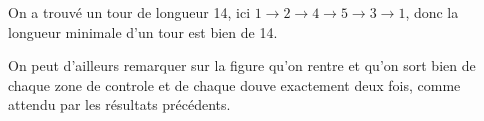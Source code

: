 {\begin{td-sol}[]
\begin{enumerate}
            On a trouvé un tour de longueur 14, ici \(1 \to 2 \to 4 \to 5 \to 3 \to 1\), donc la longueur minimale d'un tour est bien de 14.

            On peut d'ailleurs remarquer sur la figure qu'on rentre et qu'on sort bien de chaque zone de controle et de chaque douve exactement deux fois, comme attendu par les résultats précédents.
        \end{enumerate}
	\end{td-sol}
}{}